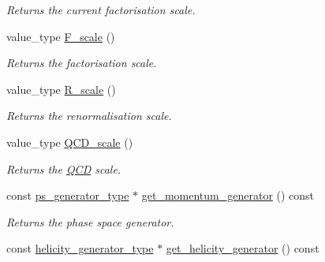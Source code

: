 \begin{DoxyCompactItemize}
\begin{DoxyCompactList}\small\item\em Returns the current factorisation scale. \end{DoxyCompactList}\item 
\hypertarget{a00430_a59b6a343a569e528b7696037e66b46c4}{value\-\_\-type \hyperlink{a00430_a59b6a343a569e528b7696037e66b46c4}{F\-\_\-scale} ()}\label{a00430_a59b6a343a569e528b7696037e66b46c4}

\begin{DoxyCompactList}\small\item\em Returns the factorisation scale. \end{DoxyCompactList}\item 
\hypertarget{a00430_a01dcc402f85247beb330b81fb5db1290}{value\-\_\-type \hyperlink{a00430_a01dcc402f85247beb330b81fb5db1290}{R\-\_\-scale} ()}\label{a00430_a01dcc402f85247beb330b81fb5db1290}

\begin{DoxyCompactList}\small\item\em Returns the renormalisation scale. \end{DoxyCompactList}\item 
\hypertarget{a00430_a58d8c637591672f8355c333d774606fc}{value\-\_\-type \hyperlink{a00430_a58d8c637591672f8355c333d774606fc}{Q\-C\-D\-\_\-scale} ()}\label{a00430_a58d8c637591672f8355c333d774606fc}

\begin{DoxyCompactList}\small\item\em Returns the \hyperlink{a00449}{Q\-C\-D} scale. \end{DoxyCompactList}\item 
\hypertarget{a00430_aa00ae8fc9b174806a29447b0416216a4}{const \hyperlink{a00441}{ps\-\_\-generator\-\_\-type} $\ast$ \hyperlink{a00430_aa00ae8fc9b174806a29447b0416216a4}{get\-\_\-momentum\-\_\-generator} () const }\label{a00430_aa00ae8fc9b174806a29447b0416216a4}

\begin{DoxyCompactList}\small\item\em Returns the phase space generator. \end{DoxyCompactList}\item 
\hypertarget{a00430_ad86eef948e9057c2483c84494be6bfb0}{const \hyperlink{a00266}{helicity\-\_\-generator\-\_\-type} $\ast$ \hyperlink{a00430_ad86eef948e9057c2483c84494be6bfb0}{get\-\_\-helicity\-\_\-generator} () const }\label{a00430_ad86eef948e9057c2483c84494be6bfb0}


\end{DoxyCompactItemize}
